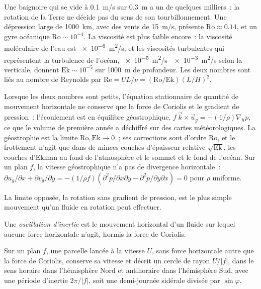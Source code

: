 Une baignoire qui se vide à \qty{0.1}{m/s} sur \qty{0.3}{m} a un  de
quelques milliers~: la rotation de la Terre ne décide pas du sens de son
tourbillonnement. Une dépression large de \qty{1000}{km}, avec des vents de \qty{15}{m/s}, présente
$\mathrm{Ro} \approx 0.14$, et un gyre océanique $\mathrm{Ro} \sim 10^{-4}$.
La viscosité est plus faible encore~: la viscosité moléculaire de l'eau est
\qty{e-6}{m^2/s}, et les viscosités turbulentes qui représentent la turbulence
de l'océan, \qtyrange{e-5}{e-3}{m^2/s} selon la verticale, donnent
$\mathrm{Ek} \sim 10^{-5}$ sur \qty{1000}{m} de profondeur. Les deux nombres sont
liés au nombre de Reynolds par $\mathrm{Re} = UL/\nu =
(\mathrm{Ro}/\mathrm{Ek})(L/H)^2$.

Lorsque les deux nombres sont petits, l'équation stationnaire de quantité de mouvement horizontale ne conserve
que la force de Coriolis et le gradient de pression~: l'écoulement est
en équilibre géostrophique, $f\,\vec k\times\vec u_g = -(1/\rho)\nabla_h p$, ce que
le volume de première année a déchiffré sur des cartes météorologiques. La géostrophie est la limite
$\mathrm{Ro}, \mathrm{Ek}\to 0$~; ses corrections sont d'ordre
$\mathrm{Ro}$, et le frottement n'agit que dans de minces couches d'épaisseur relative
$\sqrt{\mathrm{Ek}}$, les couches d'Ekman au fond de l'atmosphère et
le sommet et le fond de l'océan. Sur un plan $f$, la vitesse géostrophique
n'a pas de divergence horizontale~: $\partial u_g/\partial x + \partial
v_g/\partial y = -(1/\rho f)(\partial^2 p/\partial x\partial y -
\partial^2 p/\partial y\partial x) = 0$ pour $\rho$ uniforme.

La limite opposée, la rotation sans gradient de pression, est le plus simple
mouvement qu'un fluide en rotation peut effectuer.

\begin{definition}\label{def:b3:gfd-foundations:inertial}
Une \emph{oscillation d'inertie} est le
mouvement horizontal d'un fluide sur lequel aucune force horizontale n'agit, hormis
la force de Coriolis.
\end{definition}

\begin{theorem}\label{thm:b3:gfd-foundations:inertial}
Sur un plan $f$, une parcelle lancée à la vitesse $U$, sans force horizontale
autre que la force de Coriolis, conserve sa vitesse et décrit un cercle de rayon
$U/|f|$, dans le sens horaire dans l'hémisphère Nord et antihoraire dans
l'hémisphère Sud, avec une période d'inertie $2\pi/|f|$, soit une demi-journée sidérale
divisée par $\sin\varphi$.
\end{theorem}

